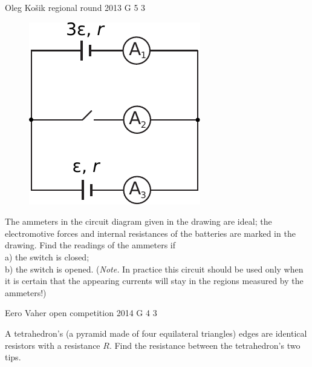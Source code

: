\documentclass[11pt]{article}
\begin{document}
{Oleg Košik} %
{regional round} %
{2013} %
{G 5} %
{3} %
{

\ifEngStatement
\begin{figure}%
\vspace{-15pt}
\includegraphics[width=\linewidth]{2013-v2g-05-skeem}%
\end{figure}
The ammeters in the circuit diagram given in the drawing are ideal; the electromotive forces and internal resistances of the batteries are marked in the drawing. Find the readings of the ammeters if\\
a) the switch is closed;\\
b) the switch is opened. (\emph{Note.}  In practice this circuit should be used only when it is certain that the appearing currents will stay in the regions measured by the ammeters!)
\fi
}

{Eero Vaher} %
{open competition} %
{2014} %
{G 4} %
{3} %
{

\ifEngStatement
A tetrahedron’s (a pyramid made of four equilateral triangles) edges are identical resistors with a resistance $R$. Find the resistance between the tetrahedron’s two tips.
\fi
}
\end{document}
